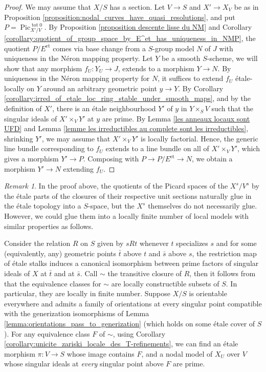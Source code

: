 \documentclass[a4paper,12pt]{amsart} %
\numberwithin{equation}{subsection}
\newcommand{\on}[1]{\operatorname{#1}}
\theoremstyle{definition}
\theoremstyle{plain}%
\theoremstyle{remark}
\newtheorem{remark}[definition]{Remark}
\begin{document}
\begin{proof}
We may assume that $X/S$ has a section. Let $V \to S$ and $X' \to X_V$ be as in Proposition \ref{proposition:nodal_curves_have_quasi_resolutions}, and put $P=\operatorname{Pic}^{\on{tot}0}_{X'/V}$. By Proposition \ref{proposition descente lisse du NM} and Corollary \ref{corollary:quotient_of_group_space_by_E^et_has_uniqueness_in_NMP}, the quotient $P/E^{\on{et}}$ comes via base change from a $S$-group model $N$ of $J$ with uniqueness in the Néron mapping property. Let $Y$ be a smooth $S$-scheme, we will show that any morphism $f_U\colon Y_U \to J$, extends to a morphism $Y \to N$. By uniqueness in the Néron mapping property for $N$, it suffices to extend $f_U$ étale-locally on $Y$ around an arbitrary geometric point $y \to Y$. By Corollary \ref{corollary:irred_of_etale_loc_ring_stable_under_smooth_maps}, and by the definition of $X'$, there is an étale neighbourhood $Y'$ of $y$ in $Y\times_S V$ such that the singular ideals of $X'\times_V Y'$ at $y$ are prime. By Lemma \ref{les anneaux locaux sont UFD} and Lemma \ref{lemme les irreductibles au complete sont les irreductibles}, shrinking $Y'$, we may assume that $X'\times_V Y'$ is locally factorial. Hence, the generic line bundle corresponding to $f_U$ extends to a line bundle on all of $X'\times_V Y'$, which gives a morphism $Y' \to P$. Composing with $P \to P/E^{\on{et}} \to N$, we obtain a morphism $Y' \to N$ extending $f_U$.
\end{proof}

\begin{remark}\label{remark:can_glue_local_models_of_curves_on_each_stratum}
In the proof above, the quotients of the Picard spaces of the $X^s/V^s$ by the étale parts of the closures of their respective unit sections naturally glue in the étale topology into a $S$-space, but the $X^s$ themselves do not necessarily glue. However, we could glue them into a locally finite number of local models with similar properties as follows.

Consider the relation $R$ on $S$ given by $sRt$ whenever $t$ specializes $s$ and for some (equivalently, any) geometric points $\bar t$ above $t$ and $\bar s$ above $s$, the restriction map of étale stalks induces a canonical isomorphism between prime factors of singular ideals of $X$ at $\bar t$ and at $\bar s$. Call $\sim$ the transitive closure of $R$, then it follows from \cite[Corollaire 9.7.10]{EGA4.3} that the equivalence classes for $\sim$ are locally constructible subsets of $S$. In particular, they are locally in finite number. Suppose $X/S$ is orientable everywhere and admits a family of orientations at every singular point compatible with the generization isomorphisms of Lemma \ref{lemma:orientations_pass_to_generization} (which holds on some étale cover of $S$). For any equivalence class $F$ of $\sim$, using Corollary \ref{corollary:unicite_zariski_locale_des_T-refinements}, we can find an étale morphism $\pi\colon V \to S$ whose image contains $F$, and a nodal model of $X_U$ over $V$ whose singular ideals at \emph{every} singular point above $F$ are prime.
\end{remark}
\end{document}
